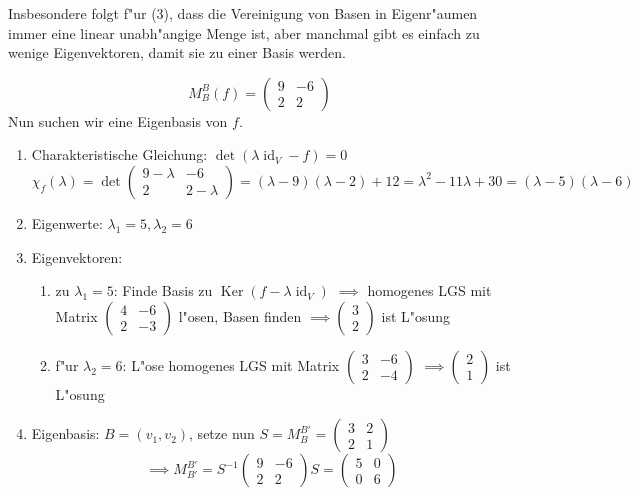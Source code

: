 \documentclass[oneside,fontsize=11pt,paper=a4,BCOR=0mm,DIV=12,automark,headsepline]{scrbook}
\newcommand{\gq}[1]{\glqq{}#1\grqq{}} %
\DeclareMathOperator{\mKer}{Ker}
\DeclareMathOperator{\mId}{id}
\theoremstyle{remark}
\theoremstyle{definition}
\theoremstyle{definition}
\theoremstyle{remark}
\begin{document}
Insbesondere folgt f"ur (3), dass die Vereinigung von Basen in Eigenr"aumen immer eine linear unabh"angige Menge ist, aber manchmal gibt es einfach \gq{zu wenige} Eigenvektoren, damit sie zu einer Basis werden.
\begin{exa}[Eigenwertberechnung]
  \[M^B_B(f) =
    \begin{pmatrix}
      9 & -6 \\
      2 & 2
    \end{pmatrix}\]
  Nun suchen wir eine Eigenbasis von \(f\).
  \begin{enumerate}
  \item Charakteristische Gleichung: \(\det(\lambda\mId_V-f)=0\)
    \[\chi_f(\lambda) = \det\begin{pmatrix}9-\lambda & -6 \\ 2 & 2-\lambda\end{pmatrix} = (\lambda - 9)(\lambda - 2) + 12 = \lambda^2 - 11\lambda + 30 = (\lambda-5)(\lambda-6)\]
  \item Eigenwerte: \(\lambda_1 = 5, \lambda_2 = 6\)
  \item Eigenvektoren:
    \begin{enumerate}
    \item zu \(\lambda_1 = 5\): Finde Basis zu \(\mKer(f - \lambda\mId_V)\) \(\implies\) homogenes LGS mit Matrix \(
        \begin{pmatrix}
          4 & -6 \\
          2 & -3
        \end{pmatrix}
      \) l"osen, Basen finden \(\implies\begin{pmatrix}3\\2\end{pmatrix}\) ist L"osung
    \item f"ur \(\lambda_2 = 6\): L"ose homogenes LGS mit Matrix \(
        \begin{pmatrix}
          3 & -6 \\
          2 & -4
        \end{pmatrix}
\) \(\implies\begin{pmatrix}2\\1\end{pmatrix}\) ist L"osung
\end{enumerate}
\item Eigenbasis: \(B = (v_1, v_2)\), setze nun \(S = M^{B'}_B=\begin{pmatrix}3 & 2\\ 2 & 1\end{pmatrix}\)
  \[\implies M^{B'}_{B'}=S^{-1}\begin{pmatrix}9 & -6 \\ 2 & 2 \end{pmatrix}S = \begin{pmatrix}5 & 0 \\ 0 & 6 \end{pmatrix}\]
  \end{enumerate}
\end{exa}
\end{document}
